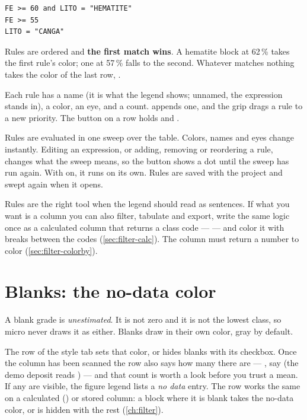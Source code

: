 \begin{lstlisting}[language=expr]
FE >= 60 and LITO = "HEMATITE"
FE >= 55
LITO = "CANGA"
\end{lstlisting}

Rules are ordered and \textbf{the first match wins}. A hematite block at 62\,\% takes the first rule's color; one at 57\,\% falls to the second. Whatever matches nothing takes the color of the last row, .

Each rule has a name (it is what the legend shows; unnamed, the expression stands in), a color, an eye, and a count.  appends one, and the  grip drags a rule to a new priority. The  button on a row holds  and .

Rules are evaluated in one sweep over the table. Colors, names and eyes change instantly. Editing an expression, or adding, removing or reordering a rule, changes what the sweep means, so the  button shows a dot until the sweep has run again. With  on, it runs on its own. Rules are saved with the project and swept again when it opens.

\begin{tip}
Rules are the right tool when the legend should read as sentences. If what you want is a column you can also filter, tabulate and export, write the same logic once as a calculated column that returns a class code —  — and color it with breaks between the codes (\cref{sec:filter-calc}). The column must return a number to color (\cref{sec:filter-colorby}).
\end{tip}

\section{Blanks: the no-data color}\label{sec:color-nodata}
A blank grade is \emph{unestimated}. It is not zero and it is not the lowest class, so micro never draws it as either. Blanks draw in their own color, gray by default.

The  row of the style tab sets that color, or hides blanks with its  checkbox. Once the column has been scanned the row also says how many there are — , say (the demo deposit reads ) — and that count is worth a look before you trust a mean. If any are visible, the figure legend lists a \emph{no data} entry. The row works the same on a calculated () or stored column: a block where it is blank takes the no-data color, or is hidden with the rest (\cref{ch:filter}).

